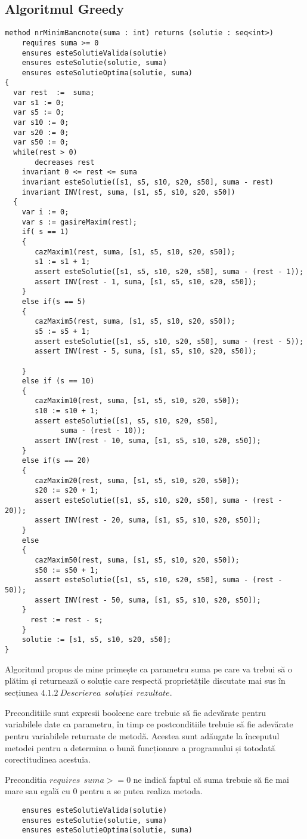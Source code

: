 \subsection{Algoritmul Greedy}
\begin{lstlisting}
method nrMinimBancnote(suma : int) returns (solutie : seq<int>)
	requires suma >= 0
	ensures esteSolutieValida(solutie)
	ensures esteSolutie(solutie, suma)
	ensures esteSolutieOptima(solutie, suma)
{
  var rest  :=  suma;
  var s1 := 0;
  var s5 := 0;
  var s10 := 0;
  var s20 := 0;
  var s50 := 0;
  while(rest > 0)
  	   decreases rest
   	invariant 0 <= rest <= suma
   	invariant esteSolutie([s1, s5, s10, s20, s50], suma - rest)
   	invariant INV(rest, suma, [s1, s5, s10, s20, s50])
  {
 	var i := 0;
	var s := gasireMaxim(rest);
	if( s == 1)
	{
	   cazMaxim1(rest, suma, [s1, s5, s10, s20, s50]);
	   s1 := s1 + 1;
	   assert esteSolutie([s1, s5, s10, s20, s50], suma - (rest - 1));
	   assert INV(rest - 1, suma, [s1, s5, s10, s20, s50]);
	}
	else if(s == 5)
	{
	   cazMaxim5(rest, suma, [s1, s5, s10, s20, s50]);
	   s5 := s5 + 1;
	   assert esteSolutie([s1, s5, s10, s20, s50], suma - (rest - 5));
	   assert INV(rest - 5, suma, [s1, s5, s10, s20, s50]);
			
	}
	else if (s == 10)
	{
	   cazMaxim10(rest, suma, [s1, s5, s10, s20, s50]);
	   s10 := s10 + 1;
	   assert esteSolutie([s1, s5, s10, s20, s50],
	   		 suma - (rest - 10));
	   assert INV(rest - 10, suma, [s1, s5, s10, s20, s50]);	
	}
	else if(s == 20)
	{
	   cazMaxim20(rest, suma, [s1, s5, s10, s20, s50]);
	   s20 := s20 + 1;
	   assert esteSolutie([s1, s5, s10, s20, s50], suma - (rest - 20));
       assert INV(rest - 20, suma, [s1, s5, s10, s20, s50]);
	}
	else
	{
	   cazMaxim50(rest, suma, [s1, s5, s10, s20, s50]);
	   s50 := s50 + 1;
	   assert esteSolutie([s1, s5, s10, s20, s50], suma - (rest - 50));
	   assert INV(rest - 50, suma, [s1, s5, s10, s20, s50]);
	}
	  rest := rest - s;
	}
	solutie := [s1, s5, s10, s20, s50];
}
\end{lstlisting}
\par 
Algoritmul propus de mine primește ca parametru suma pe care va trebui să o plătim și returnează o soluție care respectă proprietățile discutate mai sus în secțiunea $4.1.2 \ Descrierea \ \ soluției \ \ rezultate $.
\par 
Preconditiile sunt expresii booleene care trebuie să fie adevărate pentru variabilele date ca parametru, în timp ce postconditiile trebuie să fie adevărate pentru variabilele returnate de metodă. Acestea sunt adăugate la începutul metodei pentru a determina o bună funcționare a programului și totodată corectitudinea acestuia.
\par 
Preconditia $requires \ \ suma >= 0$ ne indică faptul că suma trebuie să fie mai mare sau egală cu 0 pentru a se putea realiza metoda.\par 
\vspace{0.5cm}
\begin{lstlisting}
	ensures esteSolutieValida(solutie) 
	ensures esteSolutie(solutie, suma)
	ensures esteSolutieOptima(solutie, suma)
\end{lstlisting}
 		

